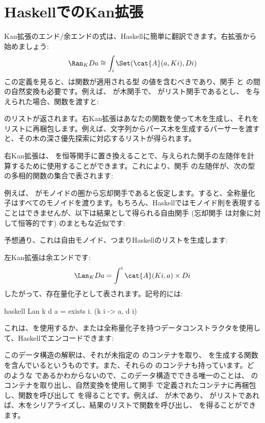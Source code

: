 \section{HaskellでのKan拡張}

Kan拡張のエンド/余エンドの式は、Haskellに簡単に翻訳できます。右拡張から始めましょう:
\[\Ran_{K}D a \cong \int_i \Set(\cat{A}(a, K i), D i)\]
この定義を見ると、は関数が適用される型  の値を含むべきであり、関手  と  の間の自然変換も必要です。例えば、 が木関手で、 がリスト関手であるとし、 を与えられた場合、関数を渡すと:

 のリストが返されます。右Kan拡張はあなたの関数を使って木を生成し、それをリストに再梱包します。例えば、文字列からパース木を生成するパーサーを渡すと、その木の深さ優先探索に対応するリストが得られます。

右Kan拡張は、 を恒等関手に置き換えることで、与えられた関手の左随伴を計算するために使用することができます。これにより、関手  の左随伴が、次の型の多相的関数の集合で表されます:

例えば、 がモノイドの圏から忘却関手であると仮定します。すると、全称量化子はすべてのモノイドを渡ります。もちろん、Haskellではモノイド則を表現することはできませんが、以下は結果として得られる自由関手 (忘却関手  は対象に対して恒等的です) のまともな近似です:

予想通り、これは自由モノイド、つまりHaskellのリストを生成します:

左Kan拡張は余エンドです:
\[\Lan_{K}D a = \int^i \cat{A}(K i, a)\times{}D i\]
したがって、存在量化子として表されます。記号的には:

\begin{snip}{haskell}
Lan k d a = exists i. (k i -> a, d i)
\end{snip}
これは、を使用するか、または全称量化子を持つデータコンストラクタを使用して、Haskellでエンコードできます:

このデータ構造の解釈は、それが未指定の  のコンテナを取り、 を生成する関数を含んでいるというものです。また、それらの  のコンテナも持っています。どのような  であるかわからないので、このデータ構造でできる唯一のことは、 のコンテナを取り出し、自然変換を使用して関手  で定義されたコンテナに再梱包し、関数を呼び出して  を得ることです。例えば、 が木であり、 がリストであれば、木をシリアライズし、結果のリストで関数を呼び出し、 を得ることができます。

